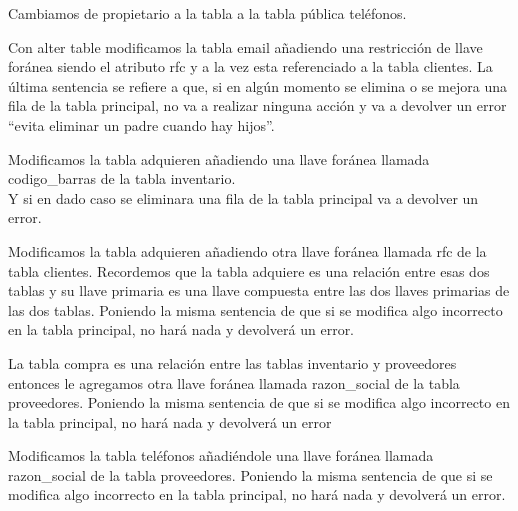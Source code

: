 \documentclass[letterpaper,12pt]{article}
\begin{document}
	Cambiamos de propietario a la tabla a la tabla pública teléfonos.
	
	
	
	Con alter table modificamos la tabla email añadiendo una restricción de llave foránea siendo el atributo rfc y a la vez esta referenciado a la tabla clientes.
	La última sentencia se refiere a que, si en algún momento se elimina o se mejora una fila de la tabla principal, no va a realizar ninguna acción y va a devolver un error “evita eliminar un padre cuando hay hijos”.
	
	
	
	Modificamos la tabla adquieren añadiendo una llave foránea llamada codigo\_barras de la tabla inventario. \\
	Y si en dado caso se eliminara una fila de la tabla principal va a devolver un error.
	
	
	
	Modificamos la tabla adquieren añadiendo otra llave foránea llamada rfc de la tabla clientes.
	Recordemos que la tabla adquiere es una relación entre esas dos tablas y su llave primaria es una llave compuesta entre las dos llaves primarias de las dos tablas.
	Poniendo la misma sentencia de que si se modifica algo incorrecto en la tabla principal, no hará nada y devolverá un error.
	
	
	
	La tabla compra es una relación entre las tablas inventario y proveedores entonces le agregamos otra llave foránea llamada razon\_social de la tabla proveedores.
	Poniendo la misma sentencia de que si se modifica algo incorrecto en la tabla principal, no hará nada y devolverá un error
	
	
	
	
	Modificamos la tabla teléfonos añadiéndole una llave foránea llamada razon\_social de la tabla proveedores.
	Poniendo la misma sentencia de que si se modifica algo incorrecto en la tabla principal, no hará nada y devolverá un error.
	
\end{document}

